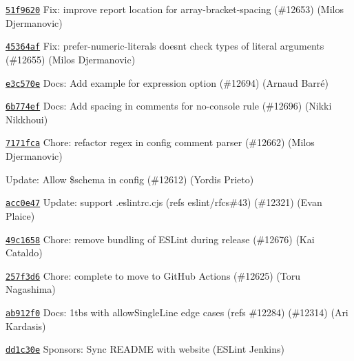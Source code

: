 \begin{DoxyItemize}
\item \href{https://github.com/eslint/eslint/commit/51f9620cc55cc091fe38dbe68e4633de06297b8c}{\texttt{ {\ttfamily 51f9620}}} Fix\+: improve report location for array-\/bracket-\/spacing (\#12653) (Milos Djermanovic)
\item \href{https://github.com/eslint/eslint/commit/45364afc9c7f0251348cd1a7a13656c3816435d7}{\texttt{ {\ttfamily 45364af}}} Fix\+: prefer-\/numeric-\/literals doesn\textquotesingle{}t check types of literal arguments (\#12655) (Milos Djermanovic)
\item \href{https://github.com/eslint/eslint/commit/e3c570eaf3d1d44fb57bf42f1870887856e4c5a0}{\texttt{ {\ttfamily e3c570e}}} Docs\+: Add example for expression option (\#12694) (Arnaud Barré)
\item \href{https://github.com/eslint/eslint/commit/6b774ef0d849ccf5c1127b25e1fe7c3e438d586b}{\texttt{ {\ttfamily 6b774ef}}} Docs\+: Add spacing in comments for no-\/console rule (\#12696) (Nikki Nikkhoui)
\item \href{https://github.com/eslint/eslint/commit/7171fca6ef4e0e8f267658fc7d8f603f00eddd84}{\texttt{ {\ttfamily 7171fca}}} Chore\+: refactor regex in config comment parser (\#12662) (Milos Djermanovic)
\item \href{https://github.com/eslint/eslint/commit/1600648d2880ffb1e9e414b31ff0f66ead7167f9}{\texttt{ {}}} Update\+: Allow \$schema in config (\#12612) (Yordis Prieto)
\item \href{https://github.com/eslint/eslint/commit/acc0e47572a9390292b4e313b4a4bf360d236358}{\texttt{ {\ttfamily acc0e47}}} Update\+: support .eslintrc.\+cjs (refs eslint/rfcs\#43) (\#12321) (Evan Plaice)
\item \href{https://github.com/eslint/eslint/commit/49c1658544ace24b9aaaa301af0fc07a2ef3bf30}{\texttt{ {\ttfamily 49c1658}}} Chore\+: remove bundling of ESLint during release (\#12676) (Kai Cataldo)
\item \href{https://github.com/eslint/eslint/commit/257f3d67905a52bf8602a5a5707c893cc90d7ca7}{\texttt{ {\ttfamily 257f3d6}}} Chore\+: complete to move to Git\+Hub Actions (\#12625) (Toru Nagashima)
\item \href{https://github.com/eslint/eslint/commit/ab912f0ef709a916ab9a27ea09d9d7adf046fb2d}{\texttt{ {\ttfamily ab912f0}}} Docs\+: 1tbs with allow\+Single\+Line edge cases (refs \#12284) (\#12314) (Ari Kardasis)
\item \href{https://github.com/eslint/eslint/commit/dd1c30e35f05ed332e2abbd3d4d53635efde74b8}{\texttt{ {\ttfamily dd1c30e}}} Sponsors\+: Sync README with website (ESLint Jenkins)

\end{DoxyItemize}
